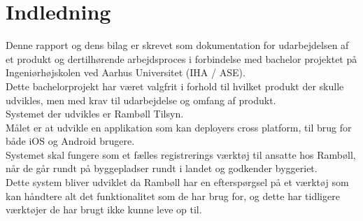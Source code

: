 \chapter{Indledning}
Denne rapport og dens bilag er skrevet som dokumentation for udarbejdelsen af et produkt
og dertilhørende arbejdsproces i forbindelse med bachelor projektet på Ingeniørhøjskolen
ved Aarhus Universitet (IHA / ASE).\\
Dette bachelorprojekt har været valgfrit i forhold til hvilket produkt der skulle udvikles, men med
krav til udarbejdelse og omfang af produkt.\\
Systemet der udvikles er Rambøll Tilsyn.\\
\newline
Målet er at udvikle en applikation som kan deployers cross platform, til brug for både iOS og Android brugere. \\
Systemet skal fungere som et fælles registrerings værktøj til ansatte hos Rambøll, når de går rundt på byggepladser rundt i landet og godkender byggeriet. \\
Dette system bliver udviklet da Rambøll har en efterspørgsel på et værktøj som kan håndtere alt det funktionalitet som de har brug for, og dette har tidligere værktøjer de har brugt ikke kunne leve op til. \\



